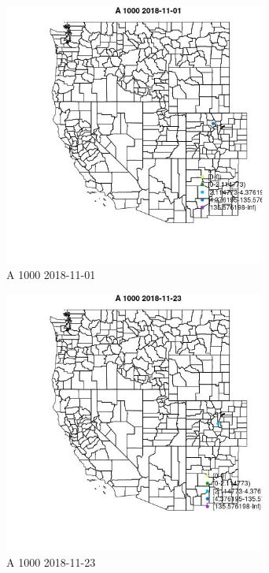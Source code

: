 \begin{figure} 
\centering  
\includegraphics[width=0.77\textwidth]{Code_Outputs/Report_ML_input_PM25_Step4_part_e_de_duplicated_aves_MapObsA_10002018-11-01.jpg} 
\caption{\label{fig:Report_ML_input_PM25_Step4_part_e_de_duplicated_avesMapObsA_10002018-11-01}A 1000 2018-11-01} 
\end{figure} 
 

\begin{figure} 
\centering  
\includegraphics[width=0.77\textwidth]{Code_Outputs/Report_ML_input_PM25_Step4_part_e_de_duplicated_aves_MapObsA_10002018-11-23.jpg} 
\caption{\label{fig:Report_ML_input_PM25_Step4_part_e_de_duplicated_avesMapObsA_10002018-11-23}A 1000 2018-11-23} 
\end{figure} 
 

